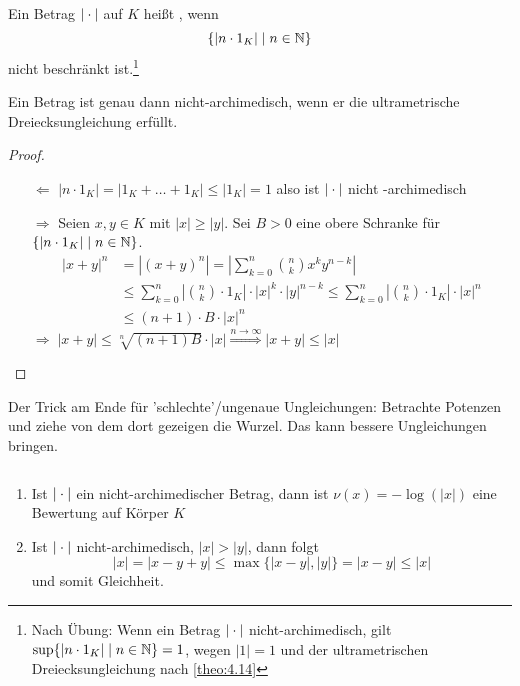 \documentclass[../main.tex]{subfiles}
\begin{document}
\begin{definition}
    Ein Betrag $|\cdot|$ auf $K$ heißt , wenn 
    $$\{|n\cdot1_K| \mid n\in \mathbb{N}\}$$
    nicht beschränkt ist.\footnote{Nach Übung: Wenn ein Betrag $|\cdot|$ nicht-archimedisch, gilt $\sup\{|n\cdot1_K| \mid n\in \mathbb{N}\} = 1$, wegen $|1| = 1$ und der ultrametrischen Dreiecksungleichung nach \ref{theo:4.14}}
\end{definition}

\begin{theorem}\label{theo:4.14}
    Ein Betrag ist genau dann nicht-archimedisch, wenn er die ultrametrische Dreiecksungleichung erfüllt.
\end{theorem}
\begin{proof}
    \begin{itemize}
        \item[$\Leftarrow$]
        $|n\cdot 1_K|= |1_K+\dots+1_K| \leq |1_K| = 1$ also ist $|\cdot|$ nicht -archimedisch
        \item[$\Rightarrow$]
        Seien $x,y\in K$ mit \obda $|x|\geq|y|$.
        Sei $B>0$ eine obere Schranke für $\{|n\cdot1_K| \mid n\in \mathbb{N}\}$.
        \begin{align*}
            |x+y|^n &= |(x+y)^n| = \left|\sum_{k=0}^n \binom{n}{k} x^k y^{n-k}\right|\\
            &\leq \sum_{k=0}^n \left|\binom{n}{k}\cdot 1_K\right| \cdot |x|^k \cdot |y|^{n-k} \leq \sum_{k=0}^n \left|\binom{n}{k}\cdot 1_K\right| \cdot |x|^n\\
            &\leq (n+1)\cdot B\cdot |x|^n
        \end{align*}
        $\Longrightarrow\;|x+y| \leq \sqrt[n]{(n+1)B} \cdot |x| \overset{n\rightarrow \infty}{\Rightarrow} |x+y| \leq |x|$
    \end{itemize}
\end{proof}
Der Trick am Ende für 'schlechte'/ungenaue Ungleichungen:
Betrachte Potenzen und ziehe von dem dort gezeigen die Wurzel. Das kann bessere Ungleichungen bringen.
\begin{remark}$ $
    \begin{enumerate}[label=\alph*)]
        \item Ist $|\cdot|$ ein nicht-archimedischer Betrag, dann ist $\nu(x) = -\log(|x|)$ eine Bewertung auf Körper $K$
        \item Ist $|\cdot|$ nicht-archimedisch, $|x|> |y|$, dann folgt 
        $$|x| = |x-y+y|\leq \max\{|x-y|,|y|\} = |x-y| \leq |x|$$
        und somit Gleichheit.
    \end{enumerate}
\end{remark}
\end{document}
